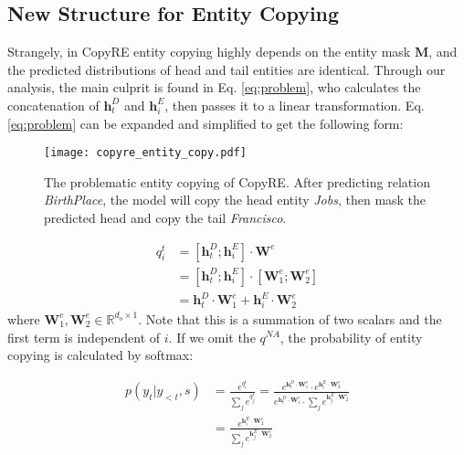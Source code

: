 \documentclass[letterpaper]{article} \usepackage{aaai20}  \usepackage{times}  \usepackage{helvet} \usepackage{courier}  \usepackage[hyphens]{url}  \usepackage{graphicx}
\begin{document}
  
  \subsection{New Structure for Entity Copying}
  Strangely, in CopyRE entity copying highly depends on the entity mask $\bm{M}$, and the predicted distributions of head and tail entities are identical. 
Through our analysis, the main culprit is found in Eq. \eqref{eq:problem}, who calculates the concatenation of  $\bm{h}^D_t$ and $\bm{h}^E_i$, then passes it to a linear transformation.
  Eq. \eqref{eq:problem} can be expanded and simplified to get the following form: 
  \begin{figure}[t]
    \centering
    \texttt{[image: copyre\_entity\_copy.pdf]}
    \caption{The problematic entity copying of CopyRE. After predicting relation \textit{BirthPlace}, the model will copy the head entity \textit{Jobs}, then mask the predicted head and copy the tail \textit{Francisco}.}
  \label{fig:problem}
  \end{figure}

  \begin{equation}
  \begin{split}
      q^t_{i} &= [\bm{h}_t^D;\bm{h}_i^E] \cdot \bm{W}^e \\
       &= [\bm{h}_t^D;\bm{h}_i^E] \cdot [\bm{W}^e_1;\bm{W}^e_2]\\ 
       &= \bm{h}_t^D \cdot \bm{W}^e_1 + \bm{h}_i^E \cdot \bm{W}^e_2 
  \end{split}
  \end{equation}
  where $\bm{W}^e_1,\bm{W}^e_2 \in \mathbb{R}^{d_o \times 1}$. 
  Note that this is a summation of two scalars and the first term is independent of $i$. 
  If we omit the $q^{NA}$, the probability of entity copying is calculated by softmax:
  
  \begin{equation}
  \begin{split}
      p(y_t|y_{<t}, s)
      &= \frac{e^{q^t_i}}{\sum_j e^{q^t_j}} 
= \frac{e^{\bm{h}_t^D \cdot \bm{W}^e_1} \cdot e^{\bm{h}_i^E \cdot \bm{W}^e_2}}{e^{ \bm{h}_t^D \cdot \bm{W}^e_1} \cdot \sum_j e^{\bm{h}_j^E \cdot \bm{W}^e_2}} \\
      &= \frac{e^{\bm{h}_i^E \cdot \bm{W}^e_2}}{\sum_j e^{\bm{h}_j^E \cdot \bm{W}^e_2}} \label{eq:reduction}
  \end{split}
  \end{equation}
  
  
\end{document}
